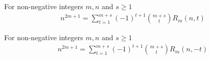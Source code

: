 \begin{proposition}
    \label{prop:odd-power-double-bivariate-multifold}
    For non-negative integers $m,n$ and $s\geq 1$
    \begin{align*}
        n^{2m+1} = \sum_{t=1}^{m+s} (-1)^{t+1} \binom{m+s}{t} R_{m} (n, t)
    \end{align*}
\end{proposition}
\begin{proposition}
    \label{prop:odd-power-double-bivariate-negated-multifold}
    For non-negative integers $m,n$ and $s \geq 1$
    \begin{align*}
        n^{2m+1} = \sum_{t=1}^{m+s} (-1)^{t+1} \binom{m+s}{t} R_{m} (n, -t)
    \end{align*}
\end{proposition}
